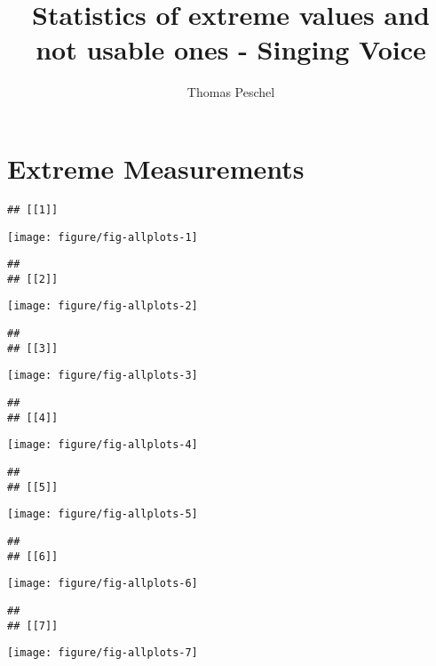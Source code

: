 \documentclass[a4]{article}\usepackage[]{graphicx}\usepackage[]{color}
\title{Statistics of extreme values and not usable ones - Singing Voice}
\author{Thomas Peschel}
\makeatletter
\def\maxwidth{ %
  \ifdim\Gin@nat@width>\linewidth
    \linewidth
  \else
    \Gin@nat@width
  \fi
}
\newenvironment{kframe}{%
 \def\at@end@of@kframe{}%
 \ifinner\ifhmode%
  \def\at@end@of@kframe{\end{minipage}}%
  \begin{minipage}{\columnwidth}%
 \fi\fi%
 \def\FrameCommand##1{\hskip\@totalleftmargin \hskip-\fboxsep
 \colorbox{shadecolor}{##1}\hskip-\fboxsep
     \hskip-\linewidth \hskip-\@totalleftmargin \hskip\columnwidth}%
 \MakeFramed {\advance\hsize-\width
   \@totalleftmargin\z@ \linewidth\hsize
   \@setminipage}}%
 {\par\unskip\endMakeFramed%
 \at@end@of@kframe}
\newenvironment{knitrout}{}{} %
\makeatother
\begin{document}
\maketitle
\tableofcontents
\newpage
\section{Extreme Measurements}
\begin{knitrout}
\color{fgcolor}\begin{kframe}
\begin{verbatim}
## [[1]]
\end{verbatim}
\end{kframe}
\texttt{[image: figure/fig-allplots-1]} 
\begin{kframe}\begin{verbatim}
## 
## [[2]]
\end{verbatim}
\end{kframe}
\texttt{[image: figure/fig-allplots-2]} 
\begin{kframe}\begin{verbatim}
## 
## [[3]]
\end{verbatim}
\end{kframe}
\texttt{[image: figure/fig-allplots-3]} 
\begin{kframe}\begin{verbatim}
## 
## [[4]]
\end{verbatim}
\end{kframe}
\texttt{[image: figure/fig-allplots-4]} 
\begin{kframe}\begin{verbatim}
## 
## [[5]]
\end{verbatim}
\end{kframe}
\texttt{[image: figure/fig-allplots-5]} 
\begin{kframe}\begin{verbatim}
## 
## [[6]]
\end{verbatim}
\end{kframe}
\texttt{[image: figure/fig-allplots-6]} 
\begin{kframe}\begin{verbatim}
## 
## [[7]]
\end{verbatim}
\end{kframe}
\texttt{[image: figure/fig-allplots-7]} 
\begin{kframe}\begin{verbatim}

\end{verbatim}
\end{kframe}
\end{knitrout}
\end{document}
